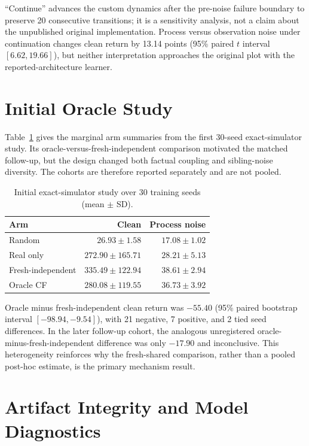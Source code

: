 \documentclass[runningheads]{llncs}
\begin{document}
``Continue'' advances the custom dynamics after the pre-noise failure boundary
to preserve 20 consecutive transitions; it is a sensitivity analysis, not a
claim about the unpublished original implementation. Process versus observation
noise under continuation changes clean return by 13.14 points (95\% paired
$t$ interval $[6.62,19.66]$), but neither interpretation approaches the
original plot with the reported-architecture learner.

\section{Initial Oracle Study}

Table~\ref{tab:initial-arms} gives the marginal arm summaries from the first
30-seed exact-simulator study. Its oracle-versus-fresh-independent comparison
motivated the matched follow-up, but the design changed both factual coupling
and sibling-noise diversity. The cohorts are therefore reported separately and
are not pooled.

\begin{table}[H]
\centering
\caption{Initial exact-simulator study over 30 training seeds (mean $\pm$ SD).}
\label{tab:initial-arms}
\small
\begin{tabular}{@{}lrr@{}}
\toprule
Arm & Clean & Process noise \\
\midrule
Random & $26.93\pm1.58$ & $17.08\pm1.02$ \\
Real only & $272.90\pm165.71$ & $28.21\pm5.13$ \\
Fresh-independent & $335.49\pm122.94$ & $38.61\pm2.94$ \\
Oracle CF & $280.08\pm119.55$ & $36.73\pm3.92$ \\
\bottomrule
\end{tabular}
\end{table}

Oracle minus fresh-independent clean return was $-55.40$ (95\% paired
bootstrap interval $[-98.94,-9.54]$), with 21 negative, 7 positive, and 2 tied
seed differences. In the later follow-up cohort, the analogous unregistered
oracle-minus-fresh-independent difference was only $-17.90$ and inconclusive.
This heterogeneity reinforces why the fresh-shared comparison, rather than a
pooled post-hoc estimate, is the primary mechanism result.

\section{Artifact Integrity and Model Diagnostics}
\end{document}

